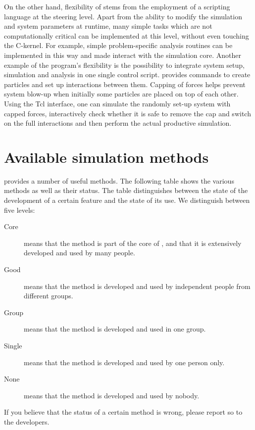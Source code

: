 On the other hand, flexibility of \es stems from the employment of a scripting language  at the steering level. Apart from the ability to modify the simulation
and system parameters at runtime, many simple tasks which are not
computationally critical can be implemented at this level, without
even touching the C-kernel.  For example, simple problem-specific
analysis routines can be implemented in this way and made interact
with the simulation core.  Another example of the program's
flexibility is the possibility to integrate system setup, simulation and
analysis in one single control script. \es provides commands to create
particles and set up interactions between them.  Capping of forces
helps prevent system blow-up when initially some particles are placed
on top of each other. Using the Tcl interface, one can simulate the
randomly set-up system with capped forces, interactively check whether
it is safe to remove the cap and switch on the full interactions and
then perform the actual productive simulation.

\section{Available simulation methods}

\es provides a number of useful methods. The following table shows the
various methods as well as their status. The table distinguishes
between the state of the development of a certain feature and the
state of its use. We distinguish between five levels:
\begin{description}
\item[Core] means that the method is part of the core of \es, and that
  it is extensively developed and used by many people.
\item[Good] means that the method is developed and used by independent
  people from different groups.
\item[Group] means that the method is developed and used in one group.
\item[Single] means that the method is developed and used by one
  person only.
\item[None] means that the method is developed and used by nobody.
\end{description}
If you believe that the status of a certain method is wrong, please
report so to the developers.

